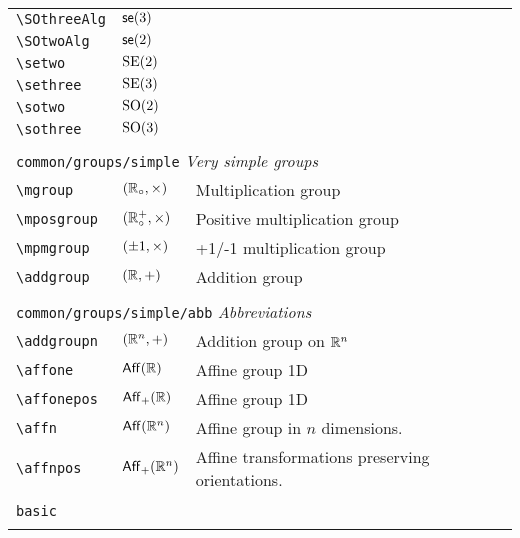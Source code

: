 \begin{longtable}{lll}
 {\color[rgb]{0.5,0.5,0.5}\texttt{\textbackslash SOthreeAlg}} & $\mathsf{se}(3)$ & \\ 
 {\color[rgb]{0.5,0.5,0.5}\texttt{\textbackslash SOtwoAlg}} & $\mathsf{se}(2)$ & \\ 
 {\color[rgb]{0.5,0.5,0.5}\texttt{\textbackslash setwo}} & $\mathrm{SE(2)}$ & \\ 
 {\color[rgb]{0.5,0.5,0.5}\texttt{\textbackslash sethree}} & $\mathrm{SE(3)}$ & \\ 
 {\color[rgb]{0.5,0.5,0.5}\texttt{\textbackslash sotwo}} & $\mathrm{SO}(2)$ & \\ 
 {\color[rgb]{0.5,0.5,0.5}\texttt{\textbackslash sothree}} & $\mathrm{SO(3)}$ & \\ 
  &  & \\ 
 \multicolumn{3}{l}{{\color[rgb]{0.5,0.5,0.5}\texttt{common/groups/simple}} \emph{Very simple groups}}\\ 
 \hline
{\color[rgb]{0.5,0.5,0.5}\texttt{\textbackslash mgroup}} & $(\mathbb{R}_{\circ},\times)$ &  Multiplication group\\ 
 {\color[rgb]{0.5,0.5,0.5}\texttt{\textbackslash mposgroup}} & $(\mathbb{R}^{+}_{\circ},\times)$ &  Positive multiplication group\\ 
 {\color[rgb]{0.5,0.5,0.5}\texttt{\textbackslash mpmgroup}} & $(\pm1,\times)$ &  +1/-1 multiplication group\\ 
 {\color[rgb]{0.5,0.5,0.5}\texttt{\textbackslash addgroup}} & $(\mathbb{R},+)$ &  Addition group\\ 
  &  & \\ 
 \multicolumn{3}{l}{{\color[rgb]{0.5,0.5,0.5}\texttt{common/groups/simple/abb}} \emph{Abbreviations}}\\ 
 \hline
{\color[rgb]{0.5,0.5,0.5}\texttt{\textbackslash addgroupn}} & $(\mathbb{R}^n,+)$ &  Addition group on $\mathbb{R}^n$\\ 
 {\color[rgb]{0.5,0.5,0.5}\texttt{\textbackslash affone}} & $\mathsf{Aff}(\mathbb{R})$ &  Affine group 1D\\ 
 {\color[rgb]{0.5,0.5,0.5}\texttt{\textbackslash affonepos}} & $\mathsf{Aff}_{+}(\mathbb{R})$ &  Affine group 1D\\ 
 {\color[rgb]{0.5,0.5,0.5}\texttt{\textbackslash affn}} & $\mathsf{Aff}(\mathbb{R}^n)$ &  Affine group in $n$ dimensions.\\ 
 {\color[rgb]{0.5,0.5,0.5}\texttt{\textbackslash affnpos}} & $\mathsf{Aff}_{+}(\mathbb{R}^n)$ &  Affine transformations preserving orientations.\\ 
  &  & \\ 
 \multicolumn{3}{l}{{\color[rgb]{0.5,0.5,0.5}\texttt{basic}} \emph{}}\\ 
 \hline
\hline
 &  & \\ 

\end{longtable}
